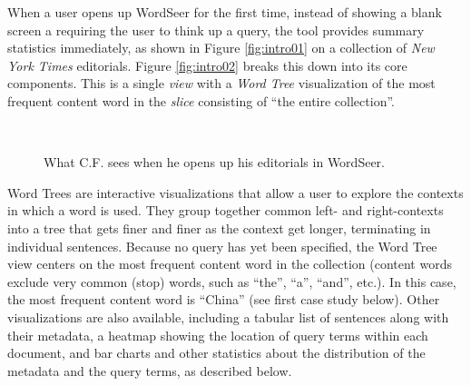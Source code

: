 \documentclass{sig-alternate}
\begin{document}
When a user opens up WordSeer for the first time, instead of  showing a blank screen a requiring the user to think up a query, the tool  provides summary statistics immediately, as shown in Figure \ref{fig:intro01} on a collection of \emph{New York Times} editorials.  Figure \ref{fig:intro02} breaks this down into its core components. This is a single \emph{view} with a \emph{Word Tree} visualization of the most frequent content word in the \emph{slice} consisting of ``the entire collection''. 



\begin{figure}[ht!]
\begin{center}
%
        \\
%
    \end{center}
    \caption{%
        What C.F. sees when he opens up his editorials in WordSeer.
     }%
\end{figure}

Word Trees \cite{wattenberg_word_2008} are interactive visualizations that allow a user to explore the contexts in which a word is used. They group together common left- and right-contexts into a tree that gets finer and finer as the context get longer, terminating in individual sentences.  Because no query has yet been specified, the Word Tree view centers on the most frequent content word in the collection (content words exclude very common (stop) words, such as ``the'', ``a'', ``and'', etc.). In this case, the most frequent content word is ``China'' (see first case study below).  Other visualizations are also available, including a tabular list of sentences along with their metadata, a heatmap showing the location of query terms within each document, and bar charts and other statistics about the distribution of the metadata and the query terms, as described below.
\end{document}
